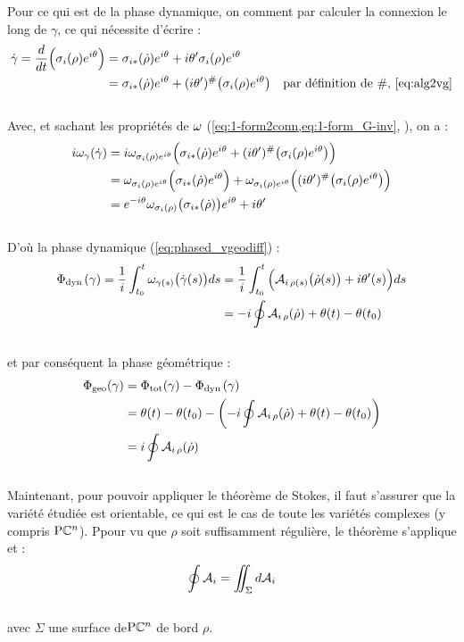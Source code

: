 Pour ce qui est de la phase dynamique, on comment par calculer la connexion le long de $\gamma$, ce qui nécessite d'écrire :
\begin{align*}
	\dot{\gamma} = \frac{d}{dt} \Big( \sigma_i(\rho) e^{i\theta} \Big) &=  \sigma_{i*}(\dot{\rho}) e^{i\theta} + i\theta' \sigma_i(\rho) e^{i\theta} \\
	&= \sigma_{i*}(\dot{\rho}) e^{i\theta} + (i\theta')^\#\big(\sigma_i(\rho) e^{i\theta}\big)  & \text{par définition de $\#$, \cref{eq:alg2vg}}
\end{align*}
\\
Avec, et sachant les propriétés de $\omega$ (\cref{eq:1-form2conn,eq:1-form_G-inv}, ), on a :
\begin{align*}
	i\omega_\gamma(\dot{\gamma}) &= i\omega_{\sigma_i(\rho) e^{i\theta}} \Big( \sigma_{i*}(\dot{\rho}) e^{i\theta} + (i\theta')^\#\big(\sigma_i(\rho) e^{i\theta}\big) \Big) \\
	&= \omega_{\sigma_i(\rho) e^{i\theta}} \Big( \sigma_{i*}(\dot{\rho}) e^{i\theta} \Big) + \omega_{\sigma_i(\rho) e^{i\theta}} \Big((i\theta')^\#\big(\sigma_i(\rho) e^{i\theta}\big) \Big) \\
	&= e^{-i\theta} \omega_{\sigma_i(\rho)} \big( \sigma_{i*}(\dot{\rho}) \big) e^{i\theta} + i\theta'
\end{align*}
\\
D'où la phase dynamique (\cref{eq:phased_vgeodiff}) :
\begin{align*}
	\Phi_{\text{\normalfont dyn}\, }(\gamma) = \frac{1}{i}\int_{t_0}^t \omega_{\gamma(s)} \big( \dot{\gamma}(s) \big)ds 
	&= \frac{1}{i}\int_{t_0}^t \Big( \mathcal{A}_{i\, \rho(s)}\big(\dot{\rho}(s) \big) + i\theta'(s)\Big)ds \\
	&= -i \oint \mathcal{A}_{i\, \rho} (\dot{\rho}) + \theta(t) - \theta(t_0)
\end{align*}
\\
et par conséquent la phase géométrique :
\begin{align*}
	\Phi_{\text{\normalfont geo}}(\gamma) &= \Phi_{\text{\normalfont tot}}(\gamma) - \Phi_{\text{\normalfont dyn}\, }(\gamma) \\
	&= \theta(t) - \theta(t_0) - \left( -i \oint \mathcal{A}_{i\, \rho} (\dot{\rho}) + \theta(t) - \theta(t_0) \right) \\
	&= i \oint \mathcal{A}_{i\, \rho} (\dot{\rho})
\end{align*}
\\

Maintenant, pour pouvoir appliquer le théorème de Stokes, il faut s'assurer que la variété étudiée est orientable, ce qui est le cas de toute les variétés complexes \cite[sec. 8.4.2]{nakahara_geometry_2003} (y compris $\text{\normalfont P}\mathbb{C}^{n}$). Ppour vu que $\rho$ soit suffisamment régulière, le théorème s'applique et :
\[\oint \mathcal{A}_{i}  = \iint_\Sigma d\mathcal{A}_i\]
\\
avec $\Sigma$ une surface de$\text{\normalfont P}\mathbb{C}^{n}$ de bord $\rho$.
\\




